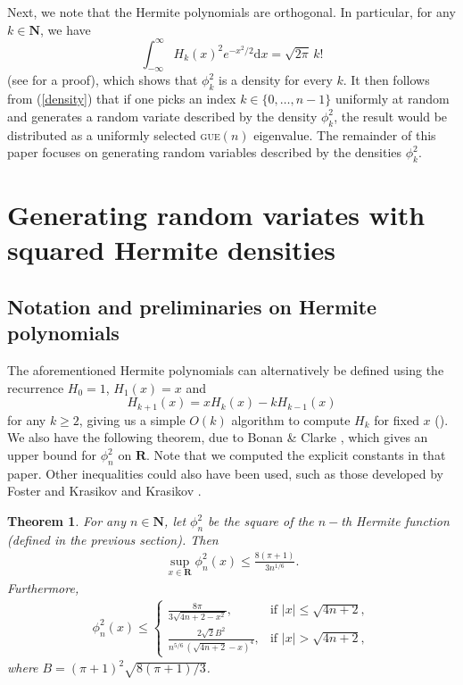 \documentclass[10pt]{article}
\newtheorem{thm}{Theorem}
\theoremstyle{definition}
\theoremstyle{remark}
\newcommand{\1}{\mathbbm{1}}
\newcommand{\0}{\mathbbm{0}}
\renewcommand{\mathbb}{\mathbf}
\begin{document}
Next, we note that the Hermite polynomials are orthogonal. In particular, for any $k\in \mathbb{N}$, we have 
\[
    \int_{-\infty}^\infty H_k(x)^2e^{-x^2/2}\mathrm{d}x = \sqrt{2\pi}\, k!
\]
(see \cite{sansone} for a proof), which shows that $\phi_k^2$ is a density for every $k$. It then follows from (\ref{density}) that if one picks an index $k\in \{0,\dots,n-1\}$ uniformly at random and generates a random variate described by the density $\phi_k^2$, the result would be distributed as a uniformly selected {\textsc{gue}}$(n)$ eigenvalue. The remainder of this paper focuses on generating random variables described by the densities $\phi_k^2$. 

\section{Generating random variates with squared Hermite densities}

\subsection{Notation and preliminaries on Hermite polynomials}

The aforementioned Hermite polynomials can alternatively be defined using the recurrence $H_0=1$, $H_1(x)=x$ and 
\begin{equation}\label{recurrence}
    H_{k+1}(x)=xH_k(x)-kH_{k-1}(x)
\end{equation}
for any $k\geq 2$, giving us a simple $O(k)$ algorithm to compute $H_k$ for fixed $x$ (\cite{szego}).
We also have the following theorem, due to Bonan \& Clarke \cite{bonanclarke}, which gives an upper bound for $\phi_n^2$ on $\mathbb{R}$. Note that we computed the explicit constants in that paper. Other inequalities could also have been used, such as those developed by Foster and Krasikov \cite{foster} and Krasikov \cite{krasikov}.

\begin{thm}\label{upperbound}
    For any $n\in \mathbb{N}$, let $\phi_n^2$ be the square of the $n-$th Hermite function (defined in the previous section). Then
    \begin{align*}
        \sup_{x\in \mathbb{R}} \phi_n^2(x) \leq \frac{8(\pi+1)}{3n^{1/6}} .
    \end{align*}
    Furthermore,
    \begin{align*}
        \phi_n^2(x) \leq \begin{cases}
         \frac{8\pi}{3\sqrt{4n+2-x^2}}, & \text{if $|x|\leq \sqrt{4n+2}$,} \\
        \frac{2\sqrt{2}B^2} {n^{5/6}\,(\sqrt{4n+2}-x)^{4}}, & \text{if $|x|> \sqrt{4n+2}$},
    \end{cases}
    \end{align*}
    where $B=(\pi+1)^2\sqrt{8(\pi+1)/3}$.
\end{thm}
\end{document}
